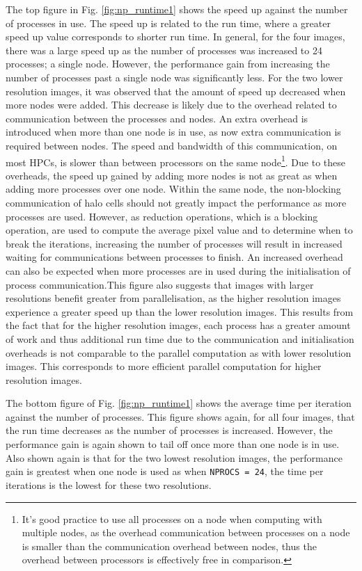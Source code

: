 \documentclass[11pt, a4paper]{article}
\begin{document}
			The top figure in Fig. \ref{fig:np_runtime1} shows the speed up against the number of processes in use. The speed up is related to the run time, where a greater speed up value corresponds to shorter run time. In general, for the four images, there was a large speed up as the number of processes was increased to 24 processes; a single node. However, the performance gain from increasing the number of processes past a single node was significantly less. For the two lower resolution images, it was observed that the amount of speed up decreased when more nodes were added. This decrease is likely due to the overhead related to communication between the processes and nodes. An extra overhead is introduced when more than one node is in use, as now extra communication is required between nodes. The speed and bandwidth of this communication, on most HPCs, is slower than between processors on the same node\footnote{It's good practice to use all processes on a node when computing with multiple nodes, as the overhead communication between processes on a node is smaller than the communication overhead between nodes, thus the overhead between processors is effectively free in comparison.}. Due to these overheads, the speed up gained by adding more  nodes is not as great as when adding more processes over one node. Within the same node, the non-blocking communication of halo cells should not greatly impact the performance as more processes are used. However, as reduction operations, which is a blocking operation, are used to compute the average pixel value and to determine when to break the iterations, increasing the number of processes will result in increased waiting  for communications between processes to finish. An increased overhead can also be expected when more processes are in used during the initialisation of process communication.This figure also suggests that images with larger resolutions benefit greater from parallelisation, as the higher resolution images experience a greater speed up than the lower resolution images. This results from the fact that for the higher resolution images, each process has a greater amount of work and thus additional run time due to the communication and initialisation overheads is not comparable to the parallel computation as with lower resolution images. This corresponds to more efficient parallel computation for higher resolution images.
			
			The bottom figure of Fig. \ref{fig:np_runtime1} shows the average time per iteration against the number of processes. This figure shows again, for all four images, that the run time decreases as the number of processes is increased.	However, the performance gain is again shown to tail off once more than one node is in use. Also shown again is that for the two lowest resolution images, the performance gain is greatest when one node is used as when \texttt{NPROCS = 24}, the time per iterations is the lowest for these two resolutions.
			
\end{document}

